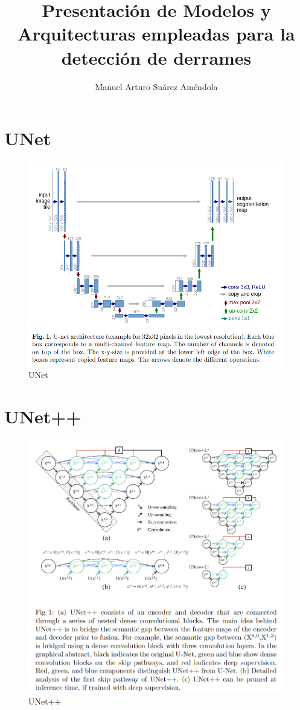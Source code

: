 \documentclass[11pt]{beamer}
\title[Modelos y Arquitecturas]
{Presentación de Modelos y Arquitecturas empleadas para la detección de derrames}
\author[Suárez, Arturo]{Manuel Arturo Suárez Améndola}
\begin{document}
\section{UNet}
\begin{figure}
  \begin{center}
    \includegraphics[scale=1.5]{images/unet.png}
  \end{center}
  \caption{UNet}\label{fig:}
\end{figure}

\section{UNet++}
\begin{figure}
  \begin{center}
    \includegraphics[scale=1.1]{images/unetpp.png}
  \end{center}
  \caption{UNet++}\label{fig:}
\end{figure}
\end{document}
